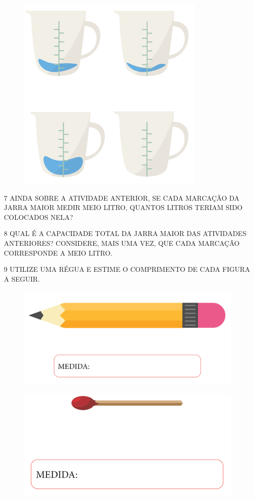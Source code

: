 \begin{figure}[htpb!]
\centering
\includegraphics[width=.4\textwidth]{../ilustracoes/MAT1/SAEB_1ANO_MAT_FIGURA39.png}
\end{figure}


\num{7} AINDA SOBRE A ATIVIDADE ANTERIOR, SE CADA MARCAÇÃO DA JARRA MAIOR MEDIR MEIO LITRO,
QUANTOS LITROS TERIAM SIDO COLOCADOS NELA?



\num{8} QUAL É A CAPACIDADE TOTAL DA JARRA MAIOR DAS ATIVIDADES ANTERIORES? CONSIDERE, MAIS UMA VEZ, QUE CADA MARCAÇÃO CORRESPONDE A MEIO LITRO.


\num{9} UTILIZE UMA RÉGUA E ESTIME O COMPRIMENTO DE CADA FIGURA A SEGUIR.

\begin{figure}[htpb!]
\centering
\includegraphics[width=.6\textwidth]{../ilustracoes/MAT1/SAEB_1ANO_MAT_FIGURA40.png}
\end{figure}

\begin{figure}[htpb!]
\centering
\includegraphics[width=.5\textwidth]{../ilustracoes/MAT1/SAEB_1ANO_MAT_FIGURA41.png}
\end{figure}

